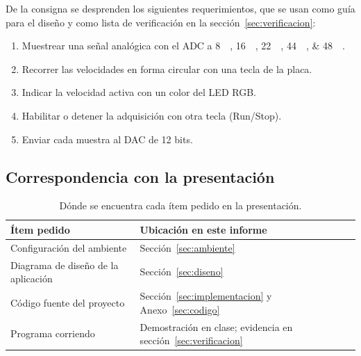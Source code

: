 \documentclass[11pt,a4paper]{article}
\begin{document}
De la consigna se desprenden los siguientes requerimientos, que se usan como
guía para el diseño y como lista de verificación en la
sección~\ref{sec:verificacion}:

\begin{enumerate}[label=\textbf{R\arabic*},leftmargin=2.2em]
  \item \label{req:fs} Muestrear una señal analógica con el ADC a
        \qtylist{8;16;22;44;48}{\kilo\sps}.
  \item \label{req:tecla-fs} Recorrer las velocidades en forma circular con
        una tecla de la placa.
  \item \label{req:led} Indicar la velocidad activa con un color del LED RGB.
  \item \label{req:runstop} Habilitar o detener la adquisición con otra tecla
        (Run/Stop).
  \item \label{req:dac} Enviar cada muestra al DAC de 12 bits.
\end{enumerate}

\subsection{Correspondencia con la presentación}

\begin{table}[H]
\centering
\caption{Dónde se encuentra cada ítem pedido en la presentación.}
\label{tab:entregables}
\begin{tabular}{@{}l l@{}}
\toprule
\textbf{Ítem pedido} & \textbf{Ubicación en este informe}\\
\midrule
Configuración del ambiente          & Sección~\ref{sec:ambiente}\\
Diagrama de diseño de la aplicación & Sección~\ref{sec:diseno}\\
Código fuente del proyecto          & Sección~\ref{sec:implementacion} y
                                      Anexo~\ref{sec:codigo}\\
Programa corriendo                  & Demostración en clase; evidencia en
                                      sección~\ref{sec:verificacion}\\
\bottomrule
\end{tabular}
\end{table}

\label{sec:ambiente}
\end{document}

